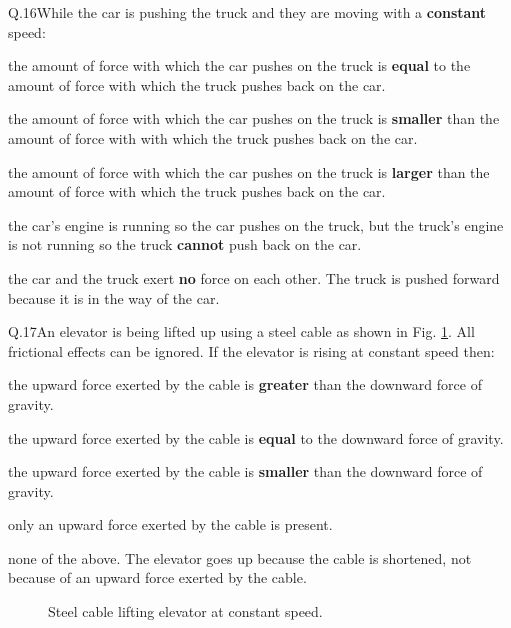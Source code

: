     \begin{mcq}{Q.16}{While the car is pushing the truck and they are moving with a \textbf{constant} speed:}
      \item the amount of force with which the car pushes on the truck is \textbf{equal} to the amount of force with which the truck pushes back on the car.
      \item the amount of force with which the car pushes on the truck is \textbf{smaller} than the amount of force with with which the truck pushes back on the car.
      \item the amount of force with which the car pushes on the truck is \textbf{larger} than the amount of force with which the truck pushes back on the car.
      \item the car's engine is running so the car pushes on the truck, but the truck's engine is not running so the truck \textbf{cannot} push back on the car.
      \item the car and the truck exert \textbf{no} force on each other. The truck is pushed forward because it is in the way of the car.
    \end{mcq}

    \begin{mcq}{Q.17}{An elevator is being lifted up using a steel cable as shown in Fig. \ref{fig:elevator}. All frictional effects can be ignored. If the elevator is rising at constant speed then:}
        \item the upward force exerted by the cable is \textbf{greater} than the downward force of gravity.
        \item the upward force exerted by the cable is \textbf{equal} to the downward force of gravity.
        \item the upward force exerted by the cable is \textbf{smaller} than the downward force of gravity.
        \item only an upward force exerted by the cable is present.
        \item none of the above. The elevator goes up because the cable is shortened, not because of an upward force exerted by the cable. 
    \end{mcq}

    \begin{figure}[h!]
       \begin{center}
          
          \caption{\label{fig:elevator} Steel cable lifting elevator at constant speed.}
       \end{center}
    \end{figure}

